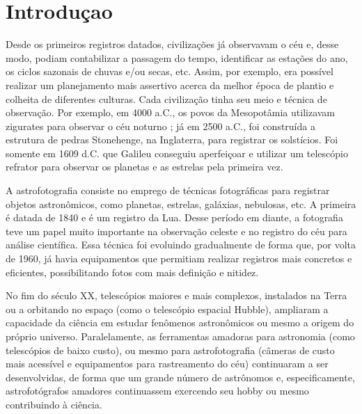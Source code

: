 \chapter{Introduçao}

Desde os primeiros registros datados, civilizações já observavam o céu e, desse modo, podiam contabilizar a passagem do tempo, identificar as estações do ano, os ciclos sazonais de chuvas e/ou secas, etc. Assim, por exemplo, era possível realizar um planejamento mais assertivo acerca da melhor época de plantio e colheita de diferentes culturas. Cada civilização tinha seu meio e técnica de observação. Por exemplo, em 4000 a.C., os povos da Mesopotâmia utilizavam zigurates para observar o céu noturno ; já em 2500 a.C., foi construída a estrutura de pedras Stonehenge, na Inglaterra, para registrar os solstícios. Foi somente em 1609 d.C. que Galileu conseguiu aperfeiçoar e utilizar um telescópio refrator para observar os planetas e as estrelas pela primeira vez. \cite{site:brescolaAstrofoto}

A astrofotografia consiste no emprego de técnicas fotográficas para registrar objetos astronômicos, como planetas, estrelas, galáxias, nebulosas, etc. A primeira é datada de 1840 e é um registro da Lua. \cite{site:introCabau} Desse período em diante, a fotografia teve um papel muito importante na observação celeste e no registro do céu para análise científica. Essa técnica foi evoluindo gradualmente de forma que, por volta de 1960, já havia equipamentos que permitiam realizar registros mais concretos e eficientes, possibilitando fotos com mais definição e nitidez. \cite{site:importanciaAstroftoSantos}

No fim do século XX, telescópios maiores e mais complexos, instalados na Terra ou a orbitando no espaço (como o telescópio espacial Hubble), ampliaram a capacidade da ciência em estudar fenômenos astronômicos ou mesmo a origem do próprio universo. \cite{site:importanciaAstroftoSantos}
Paralelamente, as ferramentas amadoras para astronomia (como telescópios de baixo custo), ou mesmo para astrofotografia (câmeras de custo mais acessível e equipamentos para rastreamento do céu) continuaram a ser desenvolvidas, de forma que um grande número de astrônomos e, especificamente, astrofotógrafos amadores continuassem exercendo seu hobby ou mesmo contribuindo à ciência.

